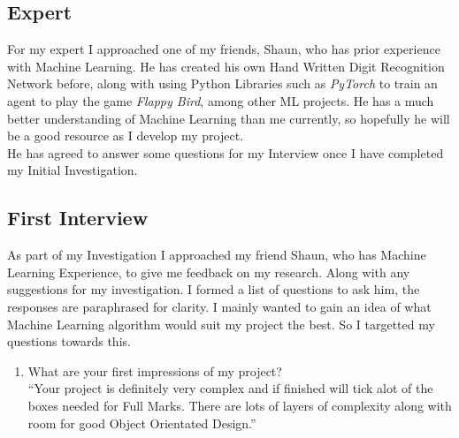 \begin{flushleft}
        \vspace{1cm}
        \subsection{Expert}
            \vspace{0.2cm}
            For my expert I approached one of my friends, Shaun, who has prior experience with Machine Learning. He has
            created his own Hand Written Digit Recognition Network before, along with using Python Libraries such as 
            \textit{PyTorch} to train an agent to play the game \textit{Flappy Bird}, among other ML projects. He has 
            a much better understanding of Machine Learning than me currently, so hopefully he will be a good resource 
            as I develop my project. \\
            \vspace{0.2cm}
            He has agreed to answer some questions for my Interview once I have completed my Initial Investigation.
            \vspace{0.2cm}

        \vspace{1cm}
        \subsection{First Interview}
            \large
            \vspace{0.2cm}
            As part of my Investigation I approached my friend Shaun, who has Machine Learning Experience, to give me feedback on my
            research. Along with any suggestions for my investigation. I formed a list of questions to ask him, the responses are
            paraphrased for clarity. I mainly wanted to gain an idea of what Machine Learning algorithm would suit my project the best.
            So I targetted my questions towards this.\\
            \vspace{0.2cm}
            \begin{enumerate}
                \item {\large What are your first impressions of my project?} \\
                \vspace{0.2cm}
                “Your project is definitely very complex and if finished will tick alot of the boxes needed for Full Marks. There are lots
                of layers of complexity along with room for good Object Orientated Design.”


\end{enumerate}
\end{flushleft}
